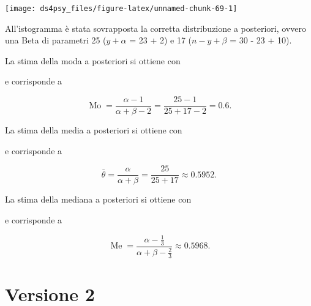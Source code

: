 \documentclass[
  11pt,
]{krantz}
\makeatletter
\newenvironment{Shaded}{\begin{snugshade}}{\end{snugshade}}
\newcommand{\CommentTok}[1]{\textcolor[rgb]{0.37,0.37,0.37}{\textit{#1}}}
\newcommand{\FunctionTok}[1]{\textcolor[rgb]{0,0,0}{#1}}
\newcommand{\NormalTok}[1]{#1}
\newcommand{\SpecialCharTok}[1]{\textcolor[rgb]{0,0,0}{#1}}
\newenvironment{kframe}{%
\medskip{}
\setlength{\fboxsep}{.8em}
 \def\at@end@of@kframe{}%
 \ifinner\ifhmode%
  \def\at@end@of@kframe{\end{minipage}}%
  \begin{minipage}{\columnwidth}%
 \fi\fi%
 \def\FrameCommand##1{\hskip\@totalleftmargin \hskip-\fboxsep
 \colorbox{shadecolor}{##1}\hskip-\fboxsep
     \hskip-\linewidth \hskip-\@totalleftmargin \hskip\columnwidth}%
 \MakeFramed {\advance\hsize-\width
   \@totalleftmargin\z@ \linewidth\hsize
   \@setminipage}}%
 {\par\unskip\endMakeFramed%
 \at@end@of@kframe}
\renewenvironment{Shaded}{\begin{kframe}}{\end{kframe}}
\DeclareMathOperator{\Me}{Me} %
\DeclareMathOperator{\Mo}{Mo} %
\theoremstyle{definition}
\theoremstyle{definition}
\theoremstyle{definition}
\theoremstyle{definition}
\theoremstyle{remark}
\makeatother
\begin{document}
\begin{center}\texttt{[image: ds4psy\_files/figure-latex/unnamed-chunk-69-1]} \end{center}

\noindent All'istogramma è stata sovrapposta la corretta distribuzione a posteriori, ovvero una Beta di parametri 25 (\(y + \alpha\) = 23 + 2) e 17 (\(n - y + \beta\) = 30 - 23 + 10).

La stima della moda a posteriori si ottiene con

\begin{Shaded}
\end{Shaded}

e corrisponde a

\[
\Mo = \frac{\alpha -1}{\alpha + \beta - 2} = \frac{25 - 1}{25 + 17 - 2} = 0.6.
\]

La stima della media a posteriori si ottiene con

\begin{Shaded}
\end{Shaded}

e corrisponde a

\[
\bar{\theta} = \frac{\alpha}{\alpha + \beta} = \frac{25}{25 + 17} \approx 0.5952.
\]

La stima della mediana a posteriori si ottiene con

\begin{Shaded}
\end{Shaded}

e corrisponde a

\[
\Me = \frac{\alpha - \frac{1}{3}}{\alpha + \beta - \frac{2}{3}} \approx 0.5968.
\]

\hypertarget{es-pratico-zetsche-funzioni}{%
\section{Versione 2}\label{es-pratico-zetsche-funzioni}}
\end{document}
